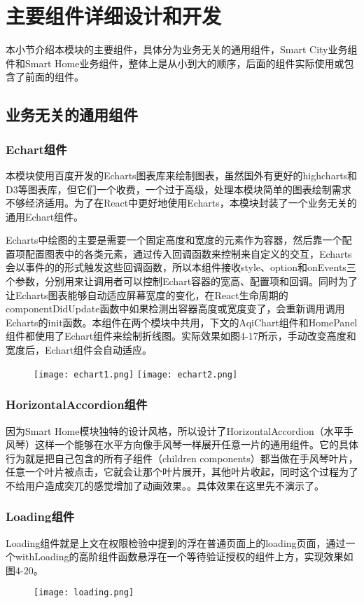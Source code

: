 \section{主要组件详细设计和开发}
本小节介绍本模块的主要组件，具体分为业务无关的通用组件，Smart City业务组件和Smart Home业务组件，整体上是从小到大的顺序，后面的组件实际使用或包含了前面的组件。
\subsection{业务无关的通用组件}
\subsubsection{Echart组件}
本模块使用百度开发的Echarts图表库来绘制图表，虽然国外有更好的highcharts和D3等图表库，但它们一个收费，一个过于高级，处理本模块简单的图表绘制需求不够经济适用。为了在React中更好地使用Echarts，本模块封装了一个业务无关的通用Echart组件。

Echarts中绘图的主要是需要一个固定高度和宽度的元素作为容器，然后靠一个配置项配置图表中的各类元素，通过传入回调函数来控制来自定义的交互，Echarts会以事件的的形式触发这些回调函数，所以本组件接收style、option和onEvents三个参数，分别用来让调用者可以控制Echart容器的宽高、配置项和回调。同时为了让Echarts图表能够自动适应屏幕宽度的变化，在React生命周期的componentDidUpdate函数中如果检测出容器高度或宽度变了，会重新调用调用Echarts的init函数。本组件在两个模块中共用，下文的AqiChart组件和HomePanel组件都使用了Echart组件来绘制折线图。实际效果如图4-17所示，手动改变高度和宽度后，Echart组件会自动适应。
\begin{figure}[!htp]
 \centering
 \texttt{[image: echart1.png]}
 \texttt{[image: echart2.png]}
\end{figure}
\subsubsection{HorizontalAccordion组件}
因为Smart Home模块独特的设计风格，所以设计了HorizontalAccordion（水平手风琴）这样一个能够在水平方向像手风琴一样展开任意一片的通用组件。它的具体行为就是把自己包含的所有子组件（children components）都当做在手风琴叶片，任意一个叶片被点击，它就会让那个叶片展开，其他叶片收起，同时这个过程为了不给用户造成突兀的感觉增加了动画效果。。具体效果在这里先不演示了。
\subsubsection{Loading组件}
Loading组件就是上文在权限检验中提到的浮在普通页面上的loading页面，通过一个withLoading的高阶组件函数悬浮在一个等待验证授权的组件上方，实现效果如图4-20。
\begin{figure}[!htp]
 \centering
 \texttt{[image: loading.png]}
\end{figure}

